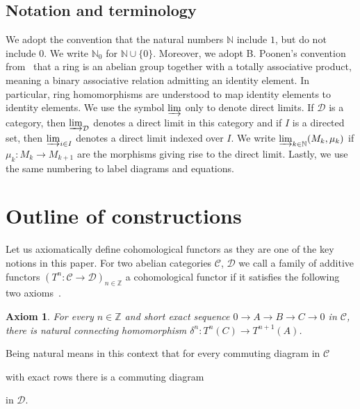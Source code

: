 \documentclass[12pt,a4paper]{article}
\numberwithin{equation}{section}
\newtheorem{axm}[thm]{Axiom}
\theoremstyle{nonumberplain}
\begin{document}
\subsection{Notation and terminology}

We adopt the convention that the natural numbers $\mathbb{N}$ include $1$, but do not include $0$. We write $\mathbb{N}_0$ for $\mathbb{N} \cup \lbrace 0 \rbrace$. Moreover, we adopt B.\! Poonen's convention from~\cite{poo18} that a ring is an abelian group together with a totally associative product, meaning a binary associative relation admitting an identity element. In particular, ring homomorphisms are understood to map identity elements to identity elements. We use the symbol $\varinjlim$ only to denote direct limits. If $\mathcal{D}$ is a category, then $\varinjlim_{\mathcal{D}}$ denotes a direct limit in this category and if $I$ is a directed set, then $\varinjlim_{i \in I}$ denotes a direct limit indexed over $I$. We write $\varinjlim_{k \in \mathbb{N}} (M_k, \mu_k)$ if $\mu_k: M_k \rightarrow M_{k+1}$ are the morphisms giving rise to the direct limit. Lastly, we use the same numbering to label diagrams and equations.

\section{Outline of constructions}\label{sec:constructions}

Let us axiomatically define cohomological functors as they are one of the key notions in this paper. For two abelian categories $\mathcal{C}$, $\mathcal{D}$ we call a family of additive functors $(T^n: \mathcal{C} \rightarrow \mathcal{D})_{n \in \mathbb{Z}}$ a cohomological functor if it satisfies the following two axioms~\cite[p.~201--202]{kro95}.

\begin{axm}\label{axm:delta}
For every $n \in \mathbb{Z}$ and short exact sequence $0 \rightarrow A \rightarrow B \rightarrow C \rightarrow 0$ in $\mathcal{C}$, there is natural connecting homomorphism $\delta^n: T^n(C) \rightarrow T^{n+1}(A)$.
\end{axm}

Being natural means in this context that for every commuting diagram in $\mathcal{C}$
\begin{center}
\end{center}
with exact rows there is a commuting diagram
\begin{center}
\end{center}
in $\mathcal{D}$.
\end{document}
